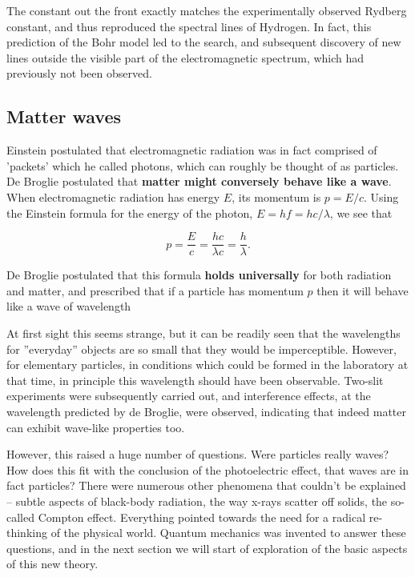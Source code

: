 \documentclass[9pt,Preprint]{lapreprint}
\begin{document}
The constant out the front exactly matches the experimentally observed Rydberg constant, and thus reproduced the spectral lines of Hydrogen. In fact, this prediction of the Bohr model led to the search, and subsequent discovery of new lines outside the visible part of the electromagnetic spectrum, which had previously not been observed.

\subsection{Matter waves}\label{Matter waves}

Einstein postulated that electromagnetic radiation was in fact comprised of 'packets' which he called photons, which can roughly be thought of as particles. De Broglie postulated that \textbf{matter might conversely behave like a wave}. When electromagnetic radiation has energy $E$, its momentum is $p = E/c$. Using the Einstein formula for the energy of the photon, $E = hf = hc/\lambda$, we see that

\begin{equation}
p = \frac{E}{c} = \frac{hc}{\lambda c} = \frac{h}{\lambda}.
\end{equation}

De Broglie postulated that this formula \textbf{holds universally} for both radiation and matter, and prescribed that if a particle has momentum $p$ then it will behave like a wave of wavelength

At first sight this seems strange, but it can be readily seen that the wavelengths for ''everyday'' objects are so small that they would be imperceptible. However, for elementary particles, in conditions which could be formed in the laboratory at that time, in principle this wavelength should have been observable. Two-slit experiments were subsequently carried out, and interference effects, at the wavelength predicted by de Broglie, were observed, indicating that indeed matter can exhibit wave-like properties too.

However, this raised a huge number of questions. Were particles really waves? How does this fit with the conclusion of the photoelectric effect, that waves are in fact particles? There were numerous other phenomena that couldn't be explained -- subtle aspects of black-body radiation, the way x-rays scatter off solids, the so-called Compton effect. Everything pointed towards the need for a radical re-thinking of the physical world. Quantum mechanics was invented to answer these questions, and in the next section we will start of exploration of the basic aspects of this new theory.
\end{document}
